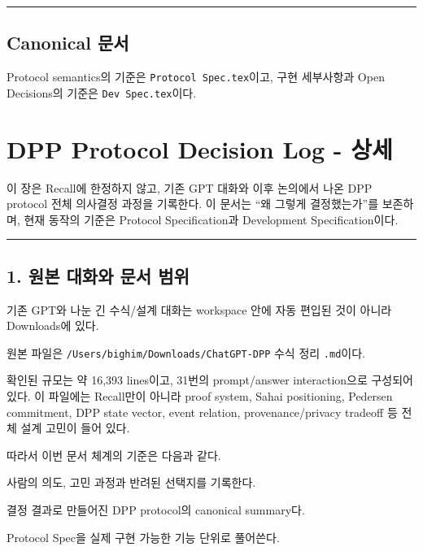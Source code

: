 \documentclass[11pt]{extarticle}
\begin{document}
\begin{center}\rule{0.5\linewidth}{0.5pt}\end{center}

\subsection{Canonical 문서}\label{canonical-uxbb38uxc11c}

Protocol semantics의 기준은 \texttt{Protocol Spec.tex}이고,
구현 세부사항과 Open Decisions의 기준은
\texttt{Dev Spec.tex}이다.

\section{DPP Protocol Decision Log -
상세}\label{dpp-protocol-decision-log---uxc0c1uxc138}

이 장은 Recall에 한정하지 않고, 기존 GPT 대화와 이후 논의에서 나온 DPP protocol
전체 의사결정 과정을 기록한다. 이 문서는 ``왜 그렇게 결정했는가''를 보존하며,
현재 동작의 기준은 Protocol Specification과 Development Specification이다.

\begin{center}\rule{0.5\linewidth}{0.5pt}\end{center}

\subsection{1. 원본 대화와 문서
범위}\label{1-uxc6d0uxbcf8-uxb300uxd654uxc640-uxbb38uxc11c-uxbc94uxc704}

기존 GPT와 나눈 긴 수식/설계 대화는 workspace 안에 자동 편입된 것이
아니라 Downloads에 있다.

원본 파일은 \texttt{/Users/bighim/Downloads/ChatGPT-DPP} 수식 정리
\texttt{.md}이다.

확인된 규모는 약 16,393 lines이고, 31번의 prompt/answer interaction으로
구성되어 있다. 이 파일에는 Recall만이 아니라 proof system, Sahai
positioning, Pedersen commitment, DPP state vector, event relation,
provenance/privacy tradeoff 등 전체 설계 고민이 들어 있다.

따라서 이번 문서 체계의 기준은 다음과 같다.

\begin{description}[leftmargin=34mm,style=nextline]
  \item[Decision Log] 사람의 의도, 고민 과정과 반려된 선택지를 기록한다.
  \item[Protocol Spec] 결정 결과로 만들어진 DPP protocol의 canonical summary다.
  \item[Development Spec] Protocol Spec을 실제 구현 가능한 기능 단위로 풀어쓴다.
\end{description}
\end{document}
